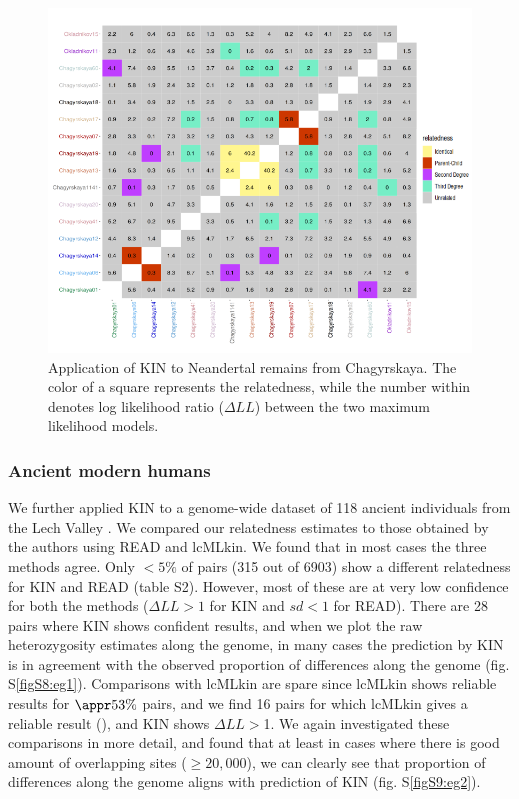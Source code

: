 \documentclass[12pt, letterpaper]{article}
\begin{document}
\begin{figure}[h!]
    \includegraphics[width=18cm]{plots/inkscape_finalImg/kinplot.png}
    \centering
    \caption{Application of KIN to Neandertal remains from Chagyrskaya. The color of a square represents the relatedness, while the number within denotes log likelihood ratio ($\Delta LL$) between the two maximum likelihood models.}
    \label{fig5:Chagyrskaya_KIN}
\end{figure}

\subsubsection{Ancient modern humans}

We further applied KIN to a genome-wide dataset of 118 ancient individuals from the Lech Valley \cite{mittnik_kinship-based_2019}. We compared our relatedness estimates to those obtained by the authors using READ and lcMLkin. We found that in most cases the three methods agree. Only $<5\%$ of pairs (315 out of 6903) show a different relatedness for KIN and READ (table S2). However, most of these are at very low confidence for both the methods ($\Delta LL>1$ for KIN and $sd<1$ for READ). There are 28 pairs where KIN shows confident results, and when we plot the raw heterozygosity estimates along the genome, in many cases the prediction by KIN is in agreement with the observed proportion of differences along the genome (fig. S\ref{figS8:eg1}). Comparisons with lcMLkin are spare since lcMLkin shows reliable results for $\appr 53\%$ pairs, and we find 16 pairs for which lcMLkin gives a reliable result (\cite{mittnik_kinship-based_2019}), and KIN shows $\Delta LL>$1. We again investigated these comparisons in more detail, and found that at least in cases where there is good amount of overlapping sites ($\geq20,000$), we can clearly see that proportion of differences along the genome aligns with prediction of KIN (fig. S\ref{figS9:eg2}). 
\end{document}
